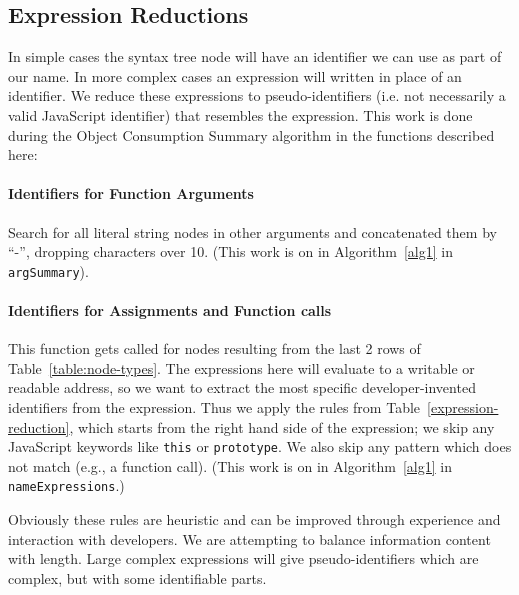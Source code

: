 \documentclass[10pt, preprint]{sigplanconf}
\begin{document}
\subsection{Expression Reductions}
\label{sec:general-element-naming}

In simple cases the syntax tree node will have an identifier we can use as part of our name. In more complex cases an expression will written in place of an identifier. We reduce these expressions to pseudo-identifiers (i.e. not necessarily a valid JavaScript identifier) that resembles the expression. This work is done during the Object Consumption Summary algorithm in the functions described here:
\paragraph{Identifiers for Function Arguments} Search for all literal string nodes in other arguments and concatenated them by ``-'', dropping  characters over 10.  
 (This work is on in Algorithm~\ref{alg1} in \verb|argSummary|).
\paragraph{Identifiers for Assignments and Function calls} This function gets called for nodes resulting from the last 2 rows of Table~\ref{table:node-types}. The expressions here will evaluate to a writable or readable address, so we want to extract the most specific developer-invented identifiers from the expression. Thus we apply the rules from Table~\ref{expression-reduction}, which starts from the right hand side of the expression; we skip any JavaScript keywords like \texttt{this} or \texttt{prototype}. We also skip any pattern which does not match (e.g., a function call). (This work is on in Algorithm~\ref{alg1} in \verb|nameExpressions|.)

Obviously these rules are heuristic and can be improved through experience and interaction with developers. We are attempting to balance information content with length. Large complex expressions will give pseudo-identifiers which are complex, but with some identifiable parts.
\end{document}
